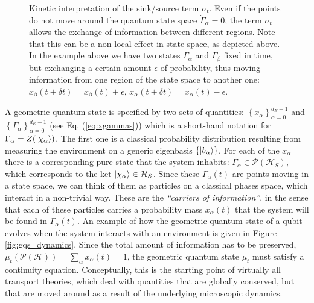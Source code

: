 \documentclass[draft,nofootinbib,pre,twocolumn,showpacs,showkeys,preprintnumbers,floatfix]{revtex4-1}
\newcommand{\1}{\mathbbm{1}}
\newcommand{\PH}{\mathcal{P}(\mathcal{H})}
\begin{document}
\begin{figure}[t!]
\begin{minipage}[t]{.45\textwidth}
\caption{Kinetic interpretation of the sink/source term $\sigma_t$. Even if the points do not move around
	the quantum state space $\dot{\Gamma}_\alpha=0$, the term $\sigma_t$ allows the exchange of information 
	between different regions. Note that this can be a non-local effect in state space, as depicted above. In the 
	example above	we have two states $\Gamma_\alpha$ and $\Gamma_\beta$ fixed in time, but exchanging 
	a certain amount $\epsilon$ of probability, thus moving information from one region of the state space to 
	another one: $x_\beta(t+\delta t) = x_\beta(t)+\epsilon$, $x_\alpha(t+\delta t) 	= x_\alpha(t) - \epsilon$.
	}
\label{fig:sigma_term}
\end{minipage}
\end{figure}
A geometric quantum state is specified by two sets of quantities: $\left\{x_\alpha\right\}_{\alpha=0}^{d_E-1}$
and $\left\{ \Gamma_\alpha\right\}_{\alpha=0}^{d_E-1}$ (see Eq. (\ref{eq:xgammas})) which is a short-hand notation for 
$\Gamma_\alpha = Z(\ket{\chi_\alpha})$. The first one is a classical probability distribution
resulting from measuring the environment on a generic eigenbasis $\left\{\ket{b_\alpha} \right\}$. For each of the $x_\alpha$
there is a corresponding pure state that the system inhabits: $\Gamma_\alpha \in \mathcal{P}(\mathcal{H}_S)$,
which corresponds to the ket $\ket{\chi_\alpha} \in \mathcal{H}_S$. Since these $\Gamma_\alpha(t)$ are points moving 
in a state space, we can think of them as particles on a classical phases space, 
which interact in a non-trivial way. These are the \emph{``carriers of information''}, in the sense that each of 
these particles carries a probability mass $x_\alpha(t)$ that the system will be found in $\Gamma_\alpha(t)$.
An example of how the geometric quantum state of a qubit evolves when the system 
interacts with an environment is given in Figure \ref{fig:gqs_dynamics}. Since the total amount 
of information has to be preserved, $\mu_t(\PH) = \sum_\alpha x_\alpha(t) =1$,
the geometric quantum state $\mu_t$ must satisfy a continuity equation. Conceptually, this is 
the starting point of virtually all transport theories, which deal with quantities that are globally 
conserved, but that are moved around as a result of the underlying microscopic dynamics.
\end{document}
